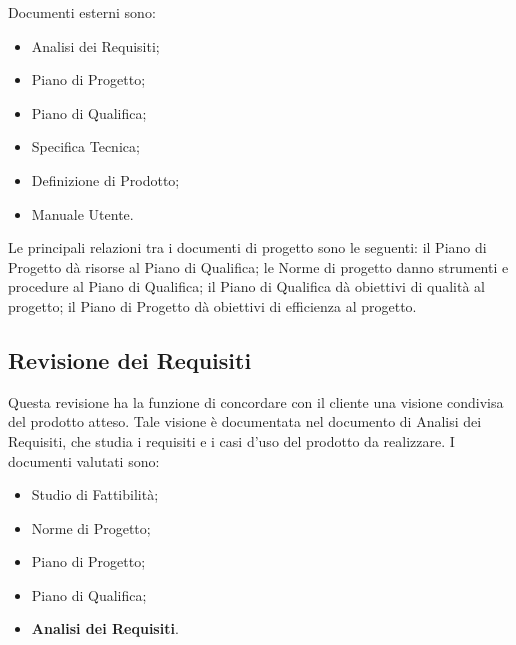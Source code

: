 \documentclass[a4paper]{article}
\begin{document}
		
Documenti esterni sono:
		
	\begin{itemize}
		
			
	\item Analisi dei Requisiti;
			
	\item Piano di Progetto;
			
	\item Piano di Qualifica;
			
	\item Specifica Tecnica;
			
	\item Definizione di Prodotto;
			
	\item Manuale Utente.
		
	\end{itemize}

		
Le principali relazioni tra i documenti di progetto sono le seguenti: il Piano di Progetto dà risorse al Piano di Qualifica; le Norme di progetto danno strumenti e procedure al Piano di Qualifica; il Piano di Qualifica dà obiettivi di qualità al progetto; il Piano di Progetto dà obiettivi di efficienza al progetto.

		
	\subsection{Revisione dei Requisiti}

		
Questa revisione ha la funzione di concordare con il cliente una visione condivisa del prodotto atteso. Tale visione è documentata nel documento di Analisi dei Requisiti, che studia i requisiti e i casi d'uso del prodotto da realizzare. I documenti valutati sono:
		
	\begin{itemize}
		
			
	\item Studio di Fattibilità;
			
	\item Norme di Progetto;
			
	\item Piano di Progetto;
			
	\item Piano di Qualifica;
			
	\item \textbf{Analisi dei Requisiti}.
		
	\end{itemize}
\end{document}
